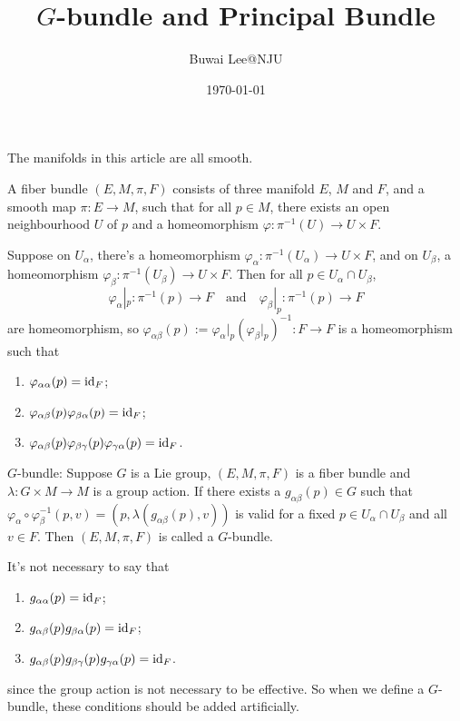 \documentclass[11pt]{article}
\begin{document}
\title{$G$-bundle and Principal Bundle}
\author{Buwai Lee@NJU}
\date{\today}
\maketitle %

The manifolds in this article are all smooth.

\para A fiber bundle $(E,M,\pi,F)$ consists of three manifold $E$, $M$ and $F$, and a smooth map $\pi:E\to M$, such that for all $p\in M$, there exists an open neighbourhood $U$ of $p$ and a homeomorphism $\varphi:\pi^{-1}(U)\to U\times F$.

Suppose on $U_{\alpha}$, there's a homeomorphism $\varphi_\alpha:\pi^{-1}(U_\alpha)\to U\times F$, and on $U_\beta$, a homeomorphism $\varphi_\beta:\pi^{-1}(U_\beta)\to U\times F$. Then for all $p\in U_\alpha\cap U_\beta$,
\[
	\varphi_{\alpha}|_p:\pi^{-1}(p)\to F\quad \text{and}\quad \varphi_{\beta}|_p:\pi^{-1}(p)\to F
\]
are homeomorphism, so $\varphi_{\alpha\beta}(p):=\varphi_{\alpha}|_p(\varphi_{\beta}|_p)^{-1}:F\to F$ is a homeomorphism such that
\begin{enumerate}
	\item $\varphi_{\alpha\alpha}(p)=\operatorname{id}_F$;
	\item $\varphi_{\alpha\beta}(p)\varphi_{\beta\alpha}(p)=\operatorname{id}_F$;
	\item $\varphi_{\alpha\beta}(p)\varphi_{\beta\gamma}(p)\varphi_{\gamma\alpha}(p)=\operatorname{id}_F$.
\end{enumerate}

\para $G$-bundle: Suppose $G$ is a Lie group, $(E,M,\pi,F)$ is a fiber bundle and $\lambda:G\times M\to M$ is a group action. If there exists a $g_{\alpha\beta}(p)\in G$ such that $\varphi_{\alpha}\circ \varphi_{\beta}^{-1}(p,v)=(p,\lambda(g_{\alpha\beta}(p),v))$ is valid for a fixed $p\in U_\alpha\cap U_\beta$ and all $v\in F$. Then $(E,M,\pi,F)$ is called a $G$-bundle.

It's not necessary to say that 
\begin{enumerate}
	\item $g_{\alpha\alpha}(p)=\operatorname{id}_F$;
	\item $g_{\alpha\beta}(p)g_{\beta\alpha}(p)=\operatorname{id}_F$;
	\item $g_{\alpha\beta}(p)g_{\beta\gamma}(p)g_{\gamma\alpha}(p)=\operatorname{id}_F$.
\end{enumerate}
since the group action is not necessary to be {\color{blue} effective}. So when we define a $G$-bundle, these conditions should be added artificially.
\end{document}
